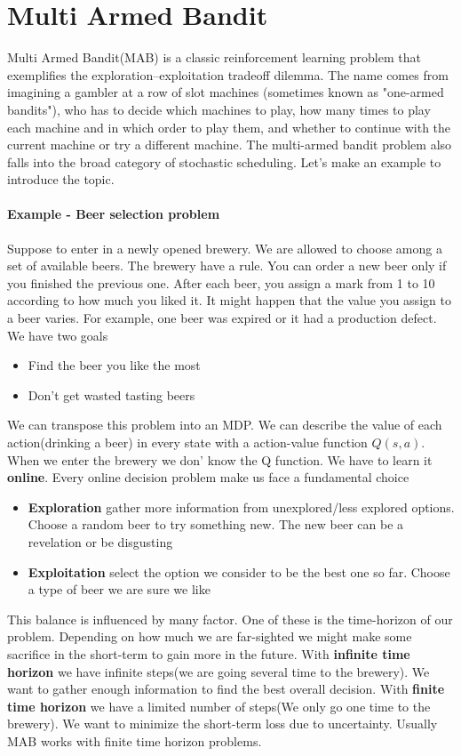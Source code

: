 \documentclass[../main.tex]{subfiles}
\begin{document}
\section{Multi Armed Bandit}
Multi Armed Bandit(MAB) is a classic reinforcement learning problem that exemplifies the exploration–exploitation tradeoff dilemma. The name comes from imagining a gambler at a row of slot machines (sometimes known as "one-armed bandits"), who has to decide which machines to play, how many times to play each machine and in which order to play them, and whether to continue with the current machine or try a different machine. The multi-armed bandit problem also falls into the broad category of stochastic scheduling. Let's make an example to introduce the topic.
\paragraph{Example - Beer selection problem} Suppose to enter in a newly opened brewery. We are allowed to choose among a set of available beers. The brewery have a rule. You can order a new beer only if you finished the previous one. After each beer, you assign a mark from 1 to 10 according to how much you liked it. It might happen that the value you assign to a beer varies. For example, one beer was expired or it had a production defect. We have two goals
\begin{itemize}
    \item Find the beer you like the most
    \item Don't get wasted tasting beers
\end{itemize}
We can transpose this problem into an MDP. We can describe the value of each action(drinking a beer) in every state with a action-value function $Q(s,a)$. When we enter the brewery we don' know the Q function. We have to learn it \textbf{online}\footnotemark. Every online decision problem make us face a fundamental choice
\begin{itemize}
    \item \textbf{Exploration} gather more information from unexplored/less explored options. Choose a random beer to try something new. The new beer can be a revelation or be disgusting
    \item \textbf{Exploitation} select the option we consider to be the best one so far. Choose a type of beer we are sure we like
\end{itemize}
This balance is influenced by many factor. One of these is the time-horizon of our problem. Depending on how much we are far-sighted we might make some sacrifice in the short-term to gain more in the future. With \textbf{infinite time horizon} we have infinite steps(we are going several time to the brewery). We want to gather enough information to find the best overall decision. With \textbf{finite time horizon} we have a limited number of steps(We only go one time to the brewery). We want to minimize the short-term loss due to uncertainty. Usually MAB works with finite time horizon problems.
\end{document}
